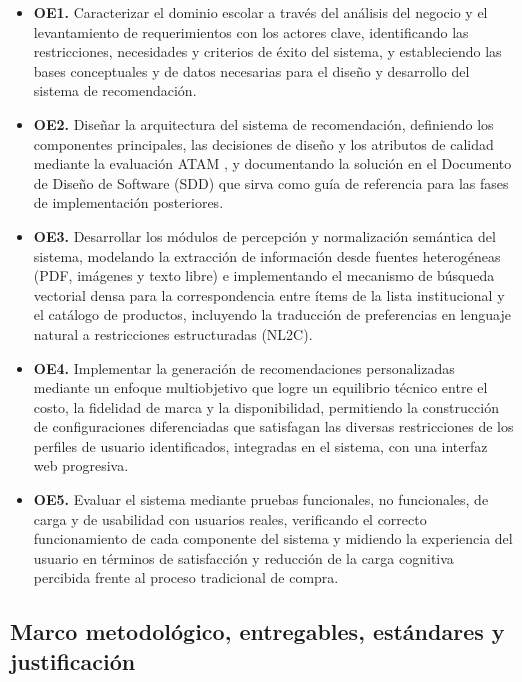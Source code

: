 \begin{itemize}
    \item \textbf{OE1.} Caracterizar el dominio escolar a través del análisis del negocio
    y el levantamiento de requerimientos con los actores clave, identificando las
    restricciones, necesidades y criterios de éxito del sistema, y estableciendo las
    bases conceptuales y de datos necesarias para el diseño y desarrollo del sistema de
    recomendación.
    \item \textbf{OE2.} Diseñar la arquitectura del sistema de recomendación, definiendo
    los componentes principales, las decisiones de diseño y los atributos de calidad
    mediante la evaluación ATAM \citep{bass_software_2021}, y documentando la solución en
    el Documento de Diseño de Software (SDD) que sirva como guía de referencia para las
    fases de implementación posteriores.
    \item \textbf{OE3.} Desarrollar los módulos de percepción y normalización semántica
    del sistema, modelando la extracción de información desde fuentes heterogéneas (PDF,
    imágenes y texto libre) e implementando el mecanismo de búsqueda vectorial densa para
    la correspondencia entre ítems de la lista institucional y el catálogo de productos,
    incluyendo la traducción de preferencias en lenguaje natural a restricciones
    estructuradas (NL2C).
    \item \textbf{OE4.} Implementar la generación de recomendaciones personalizadas
    mediante un enfoque multiobjetivo que logre un equilibrio técnico entre el costo, la
    fidelidad de marca y la disponibilidad, permitiendo la construcción de configuraciones
    diferenciadas que satisfagan las diversas restricciones de los perfiles de usuario
    identificados, integradas en el sistema, con una interfaz web progresiva.
    \item \textbf{OE5.} Evaluar el sistema mediante pruebas funcionales, no funcionales,
    de carga y de usabilidad con usuarios reales, verificando el correcto funcionamiento
    de cada componente del sistema y midiendo la experiencia del usuario en términos de
    satisfacción y reducción de la carga cognitiva percibida
    \citep{sweller_cognitive_2011} frente al proceso tradicional
    de compra.
\end{itemize}

\subsection{Marco metodológico, entregables, estándares y justificación}

